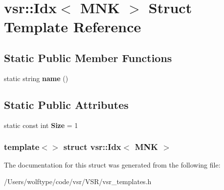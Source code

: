 \hypertarget{structvsr_1_1_idx_3_01_m_n_k_01_4}{\section{vsr\-:\-:Idx$<$ M\-N\-K $>$ Struct Template Reference}
\label{structvsr_1_1_idx_3_01_m_n_k_01_4}
}
\subsection*{Static Public Member Functions}
\begin{DoxyCompactItemize}
\item 
\hypertarget{structvsr_1_1_idx_3_01_m_n_k_01_4_a5f6c95a82e2a657677c2ce1a32ad6030}{static string {\bfseries name} ()}\label{structvsr_1_1_idx_3_01_m_n_k_01_4_a5f6c95a82e2a657677c2ce1a32ad6030}

\end{DoxyCompactItemize}
\subsection*{Static Public Attributes}
\begin{DoxyCompactItemize}
\item 
\hypertarget{structvsr_1_1_idx_3_01_m_n_k_01_4_a95258725840fbc2ffb7318ab84255fce}{static const int {\bfseries Size} = 1}\label{structvsr_1_1_idx_3_01_m_n_k_01_4_a95258725840fbc2ffb7318ab84255fce}

\end{DoxyCompactItemize}
\subsubsection*{template$<$$>$ struct vsr\-::\-Idx$<$ M\-N\-K $>$}



The documentation for this struct was generated from the following file\-:\begin{DoxyCompactItemize}
\item 
/\-Users/wolftype/code/vsr/\-V\-S\-R/vsr\-\_\-templates.\-h\end{DoxyCompactItemize}
